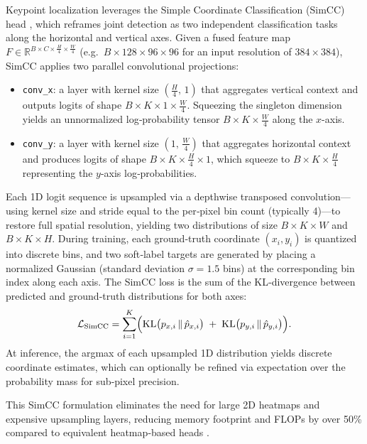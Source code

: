 Keypoint localization leverages the Simple Coordinate Classification (SimCC) head \cite{Li2022SimCC}, which reframes joint detection as two independent classification tasks along the horizontal and vertical axes. Given a fused feature map \(F \in \mathbb{R}^{B\times C\times \frac{H}{4}\times \frac{W}{4}}\) (e.g.\ \(B\times128\times96\times96\) for an input resolution of \(384\times384\)), SimCC applies two parallel convolutional projections:
\begin{itemize}
  \item \texttt{conv\_x}: a layer with kernel size \((\frac{H}{4},\,1)\) that aggregates vertical context and outputs logits of shape \(B\times K\times1\times\frac{W}{4}\).  Squeezing the singleton dimension yields an unnormalized log‐probability tensor \(B\times K\times\frac{W}{4}\) along the $x$-axis.
  \item \texttt{conv\_y}: a layer with kernel size \((1,\,\frac{W}{4})\) that aggregates horizontal context and produces logits of shape \(B\times K\times\frac{H}{4}\times1\), which squeeze to \(B\times K\times\frac{H}{4}\) representing the $y$-axis log‐probabilities.
\end{itemize}
Each 1D logit sequence is upsampled via a depthwise transposed convolution—using kernel size and stride equal to the per‐pixel bin count (typically 4)—to restore full spatial resolution, yielding two distributions of size \(B\times K\times W\) and \(B\times K\times H\).  During training, each ground‐truth coordinate \((x_i,y_i)\) is quantized into discrete bins, and two soft‐label targets are generated by placing a normalized Gaussian (standard deviation \(\sigma=1.5\) bins) at the corresponding bin index along each axis.  The SimCC loss is the sum of the KL‐divergence between predicted and ground‐truth distributions for both axes:
\[
  \mathcal{L}_{\mathrm{SimCC}}
  = \sum_{i=1}^K \Bigl(\mathrm{KL}\bigl(p_{x,i}\,\|\,\hat{p}_{x,i}\bigr)
  \;+\;\mathrm{KL}\bigl(p_{y,i}\,\|\,\hat{p}_{y,i}\bigr)\Bigr).
\]
At inference, the argmax of each upsampled 1D distribution yields discrete coordinate estimates, which can optionally be refined via expectation over the probability mass for sub‐pixel precision.

This SimCC formulation eliminates the need for large 2D heatmaps and expensive upsampling layers, reducing memory footprint and FLOPs by over 50\% compared to equivalent heatmap‐based heads \cite{Li2022SimCC}.
